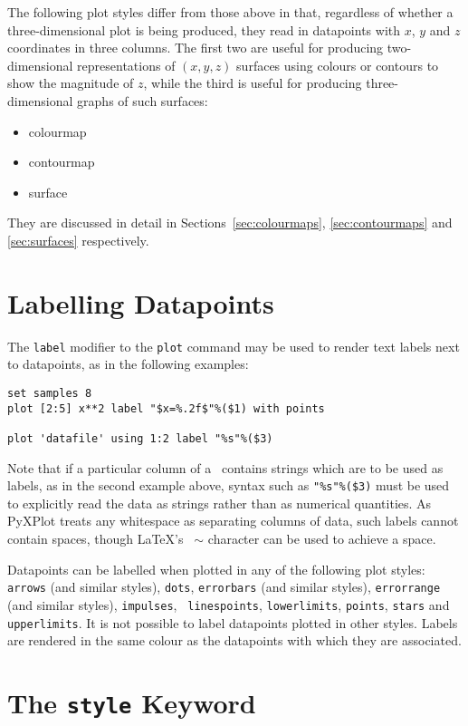 The following plot styles differ from those above in that, regardless of
whether a three-dimensional plot is being produced, they read in datapoints
with $x$, $y$ and $z$ coordinates in three columns. The first two are useful
for producing two-dimensional representations of $(x,y,z)$ surfaces using
colours or contours to show the magnitude of $z$, while the third is useful for
producing three-dimensional graphs of such surfaces:
\begin{itemize}
\item colourmap
\item contourmap
\item surface
\end{itemize}
They are discussed in detail in Sections~\ref{sec:colourmaps},
\ref{sec:contourmaps} and \ref{sec:surfaces} respectively.

\section{Labelling Datapoints}

The {\tt label} modifier to the {\tt plot} command may be used to render text
labels next to datapoints, as in the following examples:
\begin{verbatim}
set samples 8
plot [2:5] x**2 label "$x=%.2f$"%($1) with points

plot 'datafile' using 1:2 label "%s"%($3)
\end{verbatim}

\noindent Note that if a particular column of a \datafile\ contains strings
which are to be used as labels, as in the second example above, syntax such as
{\tt "\%s"\%(\$3)} must be used to explicitly read the data as strings rather
than as numerical quantities.  As PyXPlot treats any whitespace as separating
columns of data, such labels cannot contain spaces, though \LaTeX's {\tt
$\sim$} character can be used to achieve a space.

Datapoints can be labelled when plotted in any of the following plot styles:
{\tt arrows} (and similar styles), {\tt dots}, {\tt errorbars} (and similar
styles), {\tt errorrange} (and similar styles), {\tt impulses}, {\tt
linespoints}, {\tt lowerlimits}, {\tt points}, {\tt stars} and {\tt
upperlimits}. It is not possible to label datapoints plotted in other styles.
Labels are rendered in the same colour as the datapoints with which they are
associated.

\section{The {\tt style} Keyword}

